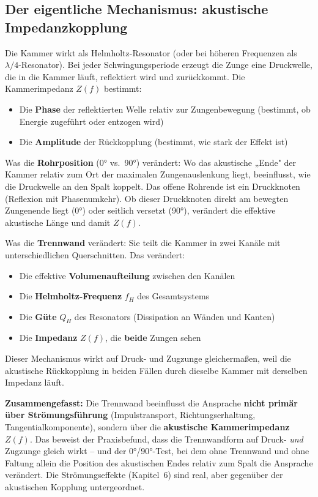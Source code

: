 \documentclass[11pt,a4paper]{article}
\begin{document}
\subsection{Der eigentliche Mechanismus: akustische Impedanzkopplung}

Die Kammer wirkt als Helmholtz-Resonator (oder bei höheren Frequenzen als $\lambda/4$-Resonator). Bei jeder Schwingungsperiode erzeugt die Zunge eine Druckwelle, die in die Kammer läuft, reflektiert wird und zurückkommt. Die Kammerimpedanz $Z(f)$ bestimmt:

\begin{itemize}[leftmargin=5mm, itemsep=1pt]
\item Die \textbf{Phase} der reflektierten Welle relativ zur Zungenbewegung (bestimmt, ob Energie zugeführt oder entzogen wird)
\item Die \textbf{Amplitude} der Rückkopplung (bestimmt, wie stark der Effekt ist)
\end{itemize}

Was die \textbf{Rohrposition} (0° vs.\ 90°) verändert: Wo das akustische „Ende" der Kammer relativ zum Ort der maximalen Zungenauslenkung liegt, beeinflusst, wie die Druckwelle an den Spalt koppelt. Das offene Rohrende ist ein Druckknoten (Reflexion mit Phasenumkehr). Ob dieser Druckknoten direkt am bewegten Zungenende liegt (0°) oder seitlich versetzt (90°), verändert die effektive akustische Länge und damit $Z(f)$.

Was die \textbf{Trennwand} verändert: Sie teilt die Kammer in zwei Kanäle mit unterschiedlichen Querschnitten. Das verändert:
\begin{itemize}[leftmargin=5mm, itemsep=1pt]
\item Die effektive \textbf{Volumenaufteilung} zwischen den Kanälen
\item Die \textbf{Helmholtz-Frequenz} $f_H$ des Gesamtsystems
\item Die \textbf{Güte} $Q_H$ des Resonators (Dissipation an Wänden und Kanten)
\item Die \textbf{Impedanz} $Z(f)$, die \textbf{beide} Zungen sehen
\end{itemize}

Dieser Mechanismus wirkt auf Druck- und Zugzunge gleichermaßen, weil die akustische Rückkopplung in beiden Fällen durch dieselbe Kammer mit derselben Impedanz läuft.

\begin{keybox}
\textbf{Zusammengefasst:} Die Trennwand beeinflusst die Ansprache \textbf{nicht primär über Strömungsführung} (Impulstransport, Richtungserhaltung, Tangentialkomponente), sondern über die \textbf{akustische Kammerimpedanz} $Z(f)$. Das beweist der Praxisbefund, dass die Trennwandform auf Druck- \textit{und} Zugzunge gleich wirkt -- und der 0°/90°-Test, bei dem ohne Trennwand und ohne Faltung allein die Position des akustischen Endes relativ zum Spalt die Ansprache verändert. Die Strömungseffekte (Kapitel~6) sind real, aber gegenüber der akustischen Kopplung untergeordnet.
\end{keybox}
\end{document}

